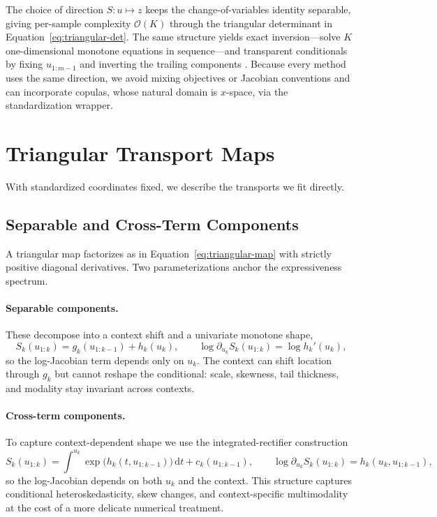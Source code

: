 \documentclass[11pt,a4paper,twoside]{book}\usepackage[]{graphicx}\usepackage[]{xcolor}
\begin{document}
The choice of direction $S:u\mapsto z$ keeps the change-of-variables identity separable, giving per-sample complexity $\mathcal{O}(K)$ through the triangular determinant in Equation~\eqref{eq:triangular-det}. The same structure yields exact inversion---solve $K$ one-dimensional monotone equations in sequence---and transparent conditionals by fixing $u_{1:m-1}$ and inverting the trailing components \citep{rosenblatt1952remarks,knothe1957contributions}. Because every method uses the same direction, we avoid mixing objectives or Jacobian conventions and can incorporate copulas, whose natural domain is $x$-space, via the standardization wrapper.

\section{Triangular Transport Maps}

With standardized coordinates fixed, we describe the transports we fit directly.

\subsection{Separable and Cross-Term Components}

A triangular map factorizes as in Equation~\eqref{eq:triangular-map} with strictly positive diagonal derivatives. Two parameterizations anchor the expressiveness spectrum.

\paragraph{Separable components.} These decompose into a context shift and a univariate monotone shape,
\begin{equation}
  S_k(u_{1:k}) = g_k(u_{1:k-1}) + h_k(u_k),
  \qquad
  \log \partial_{u_k} S_k(u_{1:k}) = \log h_k'(u_k),
  \label{eq:methods-separable}
\end{equation}
so the log-Jacobian term depends only on $u_k$. The context can shift location through $g_k$ but cannot reshape the conditional: scale, skewness, tail thickness, and modality stay invariant across contexts.

\paragraph{Cross-term components.} To capture context-dependent shape we use the integrated-rectifier construction
\begin{equation}
  S_k(u_{1:k}) = \int^{u_k} \! \exp\big(h_k(t,u_{1:k-1})\big)\, \mathrm{d}t + c_k(u_{1:k-1}),
  \qquad
  \log \partial_{u_k} S_k(u_{1:k}) = h_k(u_k,u_{1:k-1}),
  \label{eq:methods-cross}
\end{equation}
so the log-Jacobian depends on both $u_k$ and the context. This structure captures conditional heteroskedasticity, skew changes, and context-specific multimodality at the cost of a more delicate numerical treatment.
\end{document}
